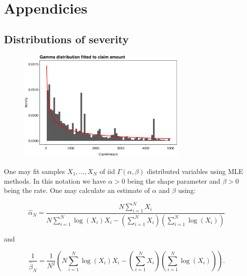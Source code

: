 \documentclass[
]{article}
\begin{document}
\newpage

\hypertarget{appendicies}{%
\section{Appendicies}\label{appendicies}}

\hypertarget{distributions-of-severity}{%
\subsection{Distributions of severity}\label{distributions-of-severity}}

\begin{figure}[h]
    \centering
    \includegraphics[width=0.75\textwidth]{figures/sev_gamma.png}
\end{figure}

One may fit samples \(X_1,...,X_N\) of iid \(\Gamma(\alpha,\beta)\)
distributed variables using MLE methods. In this notation we have
\(\alpha>0\) being the shape parameter and \(\beta > 0\) being the rate.
One may calculate an estimate of \(\alpha\) and \(\beta\) using:

\[
\hat\alpha_N=\frac{N\sum_{i=1}^NX_i}{N\sum_{i=1}^N\log(X_i)X_i-\left(\sum_{i=1}^NX_i\right)\left(\sum_{i=1}^N\log(X_i)\right)}
\]

and

\[
\frac{1}{\hat\beta_N}=\frac{1}{N^2}\left(N\sum_{i=1}^N\log(X_i)X_i-\left(\sum_{i=1}^NX_i\right)\left(\sum_{i=1}^N\log(X_i)\right)\right).
\]
\end{document}
